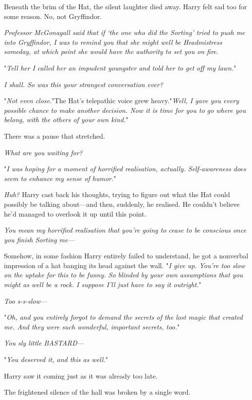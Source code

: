 Beneath the brim of the Hat, the silent laughter died away. Harry felt sad too 
for some reason. No, not Gryffindor.

\emph{Professor McGonagall said that if `the one who did the Sorting' tried to 
push me into Gryffindor, I was to remind you that she might well be 
Headmistress someday, at which point she would have the authority to set you on 
fire.}

"\emph{Tell her I called her an impudent youngster and told her to get off my 
lawn.}"

\emph{I shall. So was this your strangest conversation ever?}

"\emph{Not even close.}"The Hat's telepathic voice grew heavy."\emph{Well, I 
gave you every possible chance to make another decision. Now it is time for you 
to go where you belong, with the others of your own kind.}"

There was a pause that stretched.

\emph{What are you waiting for?}

"\emph{I was hoping for a moment of horrified realisation, actually. 
Self-awareness does seem to enhance my sense of humor.}"

\emph{Huh?} Harry cast back his thoughts, trying to figure out what the Hat 
could possibly be talking about---and then, suddenly, he realised. He couldn't 
believe he'd managed to overlook it up until this point.

\emph{You mean my horrified realisation that you're going to cease to be 
conscious once you finish Sorting me---}

Somehow, in some fashion Harry entirely failed to understand, he got a 
nonverbal impression of a hat banging its head against the wall. "\emph{I give 
up. You're too slow on the uptake for this to be funny. So blinded by your own 
assumptions that you might as well be a rock. I suppose I'll just have to say 
it outright.}"

\emph{Too s-s-slow---}

"\emph{Oh, and you entirely forgot to demand the secrets of the lost magic that 
created me. And they were such wonderful, important secrets, too.}"

\emph{You sly little BASTARD---}

"\emph{You deserved it, and this as well.}"

Harry saw it coming just as it was already too late.

The frightened silence of the hall was broken by a single word.

